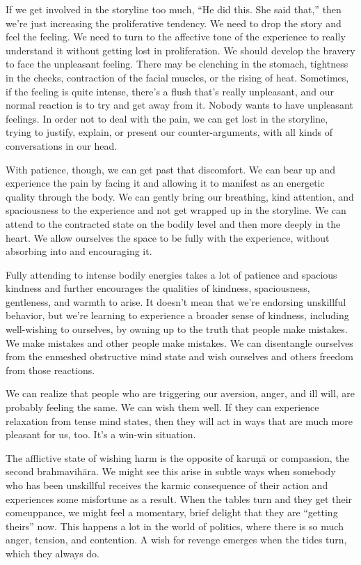 If we get involved in the storyline too much, ``He did this. She said that,'' then we're just increasing the proliferative tendency. We need to drop the story and feel the feeling. We need to turn to the affective tone of the experience to really understand it without getting lost in proliferation. We should develop the bravery to face the unpleasant feeling. There may be clenching in the stomach, tightness in the cheeks, contraction of the facial muscles, or the rising of heat. Sometimes, if the feeling is quite intense, there's a flush that's really unpleasant, and our normal reaction is to try and get away from it. Nobody wants to have unpleasant feelings. In order not to deal with the pain, we can get lost in the storyline, trying to justify, explain, or present our counter-arguments, with all kinds of conversations in our head.

With patience, though, we can get past that discomfort. We can bear up and experience the pain by facing it and allowing it to manifest as an energetic quality through the body. We can gently bring our breathing, kind attention, and spaciousness to the experience and not get wrapped up in the storyline. We can attend to the contracted state on the bodily level and then more deeply in the heart. We allow ourselves the space to be fully with the experience, without absorbing into and encouraging it.~

Fully attending to intense bodily energies takes a lot of patience and spacious kindness and further encourages the qualities of kindness, spaciousness, gentleness, and warmth to arise. It doesn't mean that we're endorsing unskillful behavior, but we're learning to experience a broader sense of kindness, including well-wishing to ourselves, by owning up to the truth that people make mistakes. We make mistakes and other people make mistakes. We can disentangle ourselves from the enmeshed obstructive mind state and wish ourselves and others freedom from those reactions.

We can realize that people who are triggering our aversion, anger, and ill will, are probably feeling the same. We can wish them well. If they can experience relaxation from tense mind states, then they will act in ways that are much more pleasant for us, too. It's a win-win situation.~

The afflictive state of wishing harm is the opposite of karuṇā or compassion, the second brahmavihāra. We might see this arise in subtle ways when somebody who has been unskillful receives the karmic consequence of their action and experiences some misfortune as a result. When the tables turn and they get their comeuppance, we might feel a momentary, brief delight that they are ``getting theirs'' now. This happens a lot in the world of politics, where there is so much anger, tension, and contention. A wish for revenge emerges when the tides turn, which they always do.


